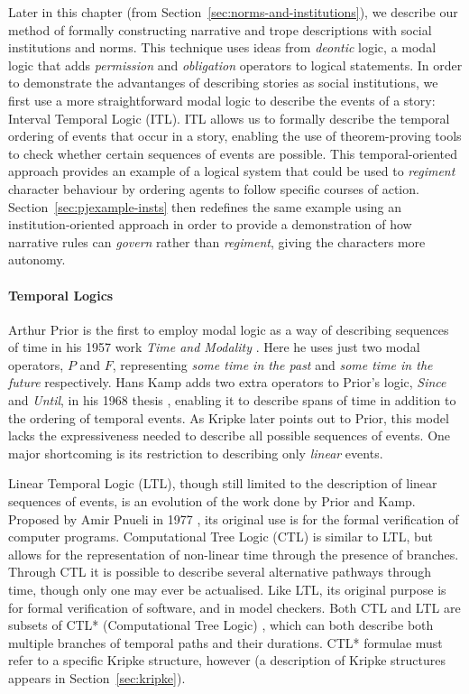 \documentclass[11pt]{report}
\begin{document}
Later in this chapter (from Section~\ref{sec:norms-and-institutions}), we describe our method of
formally constructing narrative and trope descriptions with social institutions
and norms. This technique uses ideas from \emph{deontic} logic, a modal logic
that adds \emph{permission} and \emph{obligation} operators to logical
statements. In order to demonstrate the advantanges of describing stories as
social institutions, we first use a more straightforward modal logic to describe
the events of a story: Interval Temporal Logic (ITL). ITL allows us to formally
describe the temporal ordering of events that occur in a story, enabling the use
of theorem-proving tools to check whether certain sequences of events are
possible. This temporal-oriented approach provides an example of a logical
system that could be used to \emph{regiment} character behaviour by ordering agents
to follow specific courses of action. Section~\ref{sec:pjexample-insts}
then redefines the same example using an institution-oriented approach in order
to provide a demonstration of how narrative rules can \emph{govern} rather than
\emph{regiment}, giving the characters more autonomy.

\paragraph{Temporal Logics}
Arthur Prior is the first to employ modal logic as a way of describing sequences of time in his 1957 work \emph{Time and Modality} \citep{prior2003time}. Here he uses just two modal operators, $P$ and $F$, representing \emph{some time in the past} and \emph{some time in the future} respectively.
Hans Kamp adds two extra operators to Prior's logic, \emph{Since} and \emph{Until}, in his 1968 thesis \citep{kamp1968tense}, enabling it to describe spans of time in addition to the ordering of temporal events.
As Kripke later points out to Prior, this model lacks the expressiveness needed to describe all possible sequences of events. One major shortcoming is its restriction to describing only \emph{linear} events. 

Linear Temporal Logic (LTL), though still limited to the description of linear sequences of events, is an evolution of the work done by Prior and Kamp. Proposed by Amir Pnueli in 1977 \citep{pnueli1977temporal}, its original use is for the formal verification of computer programs.
Computational Tree Logic (CTL) \citep{ben1983temporal} is similar to LTL, but allows for the representation of non-linear time through the presence of branches. Through CTL it is possible to describe several alternative pathways through time, though only one may ever be actualised. Like LTL, its original purpose is for formal verification of software, and in model checkers.
Both CTL and LTL are subsets of CTL* (Computational Tree Logic) \citep{emerson1986sometimes}, which can both describe both multiple branches of temporal paths and their durations. CTL* formulae must refer to a specific Kripke structure, however (a description of Kripke structures appears in Section~\ref{sec:kripke}).
\end{document}
